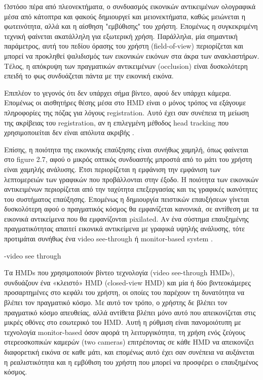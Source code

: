 Ωστόσο πέρα από πλεονεκτήματα, ο συνδυασμός εικονικών αντικειμένων ολογραφικά μέσα από κάτοπτρα και φακούς δημιουργεί και μειονεκτήματα, καθώς μειώνεται η φωτεινότητα, αλλά και η αίσθηση "εμβύθισης" του χρήστη. Επομένως η συγκεκριμένη τεχνική φαίνεται ακατάλληλη για εξωτερική χρήση. Παράλληλα, μία σημαντική παράμετρος, αυτή του πεδίου όρασης του χρήστη (field-of-view) περιορίζεται και μπορεί να προκληθεί ψαλιδισμός των εικονικών εικόνων στα άκρα των ανακλαστήρων. Τέλος, η απόκρυψη των πραγματικών αντικειμένων (occlusion) είναι δυσκολότερη επειδή το φως συνδυάζεται πάντα με την εικονική εικόνα. 

Επιπλέον το γεγονός ότι δεν υπάρχει σήμα βίντεο, αφού δεν υπάρχει κάμερα. Επομένως οι αισθητήρες θέσης μέσα στο HMD είναι ο μόνος τρόπος να εξάγουμε πληροφορίες της πόζας για λόγους registration. Αυτό έχει σαν συνέπεια τη μείωση της ακρίβειας του registration, αν η επιλεγμένη μέθοδος head tracking που χρησιμοποιείται δεν είναι απόλυτα ακριβής \cite{Malik2002} .

Επίσης, η ποιότητα της εικονικής επαύξησης είναι συνήθως χαμηλή, όπως φαίνεται στο figure 2.7, αφού ο μικρός οπτικός συνδυαστής μπροστά από το μάτι του χρήστη είναι χαμηλής ανάλυσης. Έτσι περιορίζεται η εμφάνιση την εμφάνιση των λεπτομερειών των γραφικών που προβάλλονται στην έξοδο. Η ποιότητα των εικονικών αντικειμένων περιορίζεται από την ταχύτητα επεξεργασίας και τις γραφικές ικανότητες του συστήματος επαύξησης. Επομένως η δημιουργία πειστικών επαυξήσεων γίνεται δυσκολότερη αφού ο πραγματικός κόσμος θα εμφανίζεται κανονικά, σε αντίθεση με τα εικονικά αντικείμενα που θα εμφανίζονται pixilated. Αν ένα σύστημα επαυξημένης πραγματικότητας απαιτεί εικονικά αντικείμενα με γραφικά υψηλής ανάλυσης, τότε προτιμάται συνήθως ένα video see-through ή monitor-based system \cite{Mcdonald2003} . 



-video see through


Τα HMDs που χρησιμοποιούν βίντεο τεχνολογία (video see-through HMDs), συνδυάζουν ένα «κλειστό» HMD (closed-view HMD) και μία ή δύο βιντεοκάμερες προσαρτημένες στο κεφάλι του χρήστη, οι οποίες του παρέχουν τη δυνατότητα να βλέπει τον πραγματικό κόσμο. Με αυτό τον τρόπο, ο χρήστης δε βλέπει τον πραγματικό κόσμο απευθείας, αλλά αντίθετα βλέπει μόνο αυτό που απεικονίζεται στις μικρές οθόνες στο εσωτερικό του HMD. Aυτή η ρύθμιση είναι πανομοιότυπη με τεχνολογία monitor-based όσον αφορά τη λειτυργικότητα, τη χρήση ενός ζεύγους στερεοσκοπικών καμερών (two cameras) επιτρέποντας σε κάθε HMD να απεικονίζει διαφορετική εικόνα σε καθε μάτι, και επομένως αυτό έχει σαν συνέπεια να αυξάνεται η ρεαλιστικότητα και η εμβύθιση του χρήστη που μπορεί να προσφέρει ο επαυξημένος κόσμος. 



